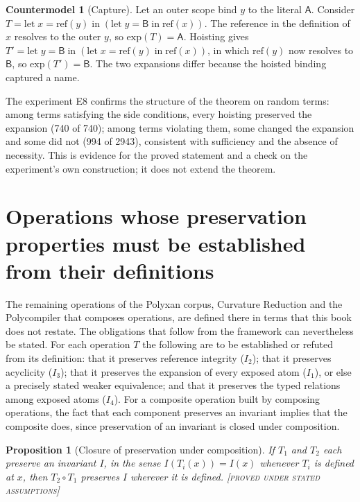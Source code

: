 \documentclass[11pt,twoside,openright]{book}
\theoremstyle{plain}
\newtheorem{proposition}[theorem]{Proposition}
\theoremstyle{definition}
\newtheorem{countermodel}[theorem]{Countermodel}
\theoremstyle{remark}
\newcommand{\Proved}{\textup{\textsc{[proved under stated assumptions]}}}
\begin{document}
\begin{countermodel}[Capture]\label{cm:capture}
Let an outer scope bind $y$ to the literal $\mathsf{A}$. Consider $T=\mathrm{let}\;x=\mathrm{ref}(y)\;\mathrm{in}\;(\mathrm{let}\;y=\mathsf{B}\;\mathrm{in}\;\mathrm{ref}(x))$. The reference in the definition of $x$ resolves to the outer $y$, so $\mathrm{exp}(T)=\mathsf{A}$. Hoisting gives $T'=\mathrm{let}\;y=\mathsf{B}\;\mathrm{in}\;(\mathrm{let}\;x=\mathrm{ref}(y)\;\mathrm{in}\;\mathrm{ref}(x))$, in which $\mathrm{ref}(y)$ now resolves to $\mathsf{B}$, so $\mathrm{exp}(T')=\mathsf{B}$. The two expansions differ because the hoisted binding captured a name.
\end{countermodel}

The experiment E8 confirms the structure of the theorem on random terms: among terms satisfying the side conditions, every hoisting preserved the expansion (740 of 740); among terms violating them, some changed the expansion and some did not (994 of 2943), consistent with sufficiency and the absence of necessity. This is evidence for the proved statement and a check on the experiment's own construction; it does not extend the theorem.

\section{Operations whose preservation properties must be established from their definitions}

The remaining operations of the Polyxan corpus, Curvature Reduction and the Polycompiler that composes operations, are defined there in terms that this book does not restate. The obligations that follow from the framework can nevertheless be stated. For each operation $T$ the following are to be established or refuted from its definition: that it preserves reference integrity ($I_2$); that it preserves acyclicity ($I_3$); that it preserves the expansion of every exposed atom ($I_1$), or else a precisely stated weaker equivalence; and that it preserves the typed relations among exposed atoms ($I_4$). For a composite operation built by composing operations, the fact that each component preserves an invariant implies that the composite does, since preservation of an invariant is closed under composition.

\begin{proposition}[Closure of preservation under composition]\label{prop:compose}
If $T_1$ and $T_2$ each preserve an invariant $I$, in the sense $I(T_i(x))=I(x)$ whenever $T_i$ is defined at $x$, then $T_2\circ T_1$ preserves $I$ wherever it is defined.
\Proved{}
\end{proposition}
\end{document}
